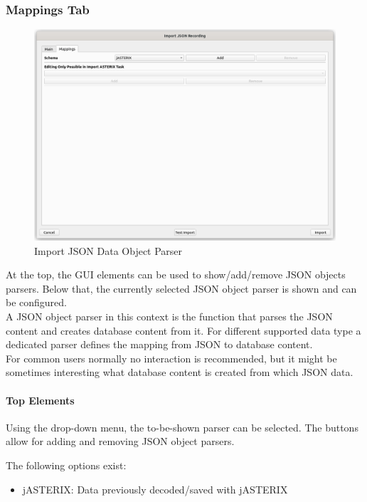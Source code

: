 \subsubsection{Mappings Tab}

\begin{figure}[H]
    \hspace*{-0.5cm}
    \includegraphics[width=17cm,frame]{figures/import_json_data_object_parser.png}
  \caption{Import JSON Data Object Parser}
\end{figure}

At the top, the GUI elements can be used to show/add/remove JSON objects parsers. Below that, the currently selected JSON object parser is shown and can be configured. \\

A JSON object parser in this context is the function that parses the JSON content and creates database content from it. For different supported  data type a dedicated parser defines the mapping from JSON to database content. \\

For common users normally no interaction is recommended, but it might be sometimes interesting what database content is created from which JSON data.

\paragraph{Top Elements}

Using the drop-down menu, the to-be-shown parser can be selected. The buttons allow for adding and removing JSON object parsers.

The following options exist:
\begin{itemize}  
\item jASTERIX: Data previously decoded/saved with jASTERIX
\end{itemize}
\ \\

